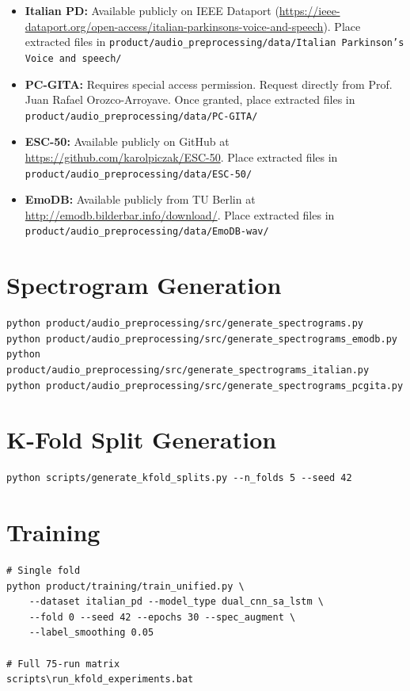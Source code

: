 \documentclass[oneside,openany]{final_report}
\begin{document}
\begin{itemize}
    \item \textbf{Italian PD:} Available publicly on IEEE Dataport (\url{https://ieee-dataport.org/open-access/italian-parkinsons-voice-and-speech}). Place extracted files in \texttt{product/audio\_preprocessing/data/Italian Parkinson's Voice and speech/}
    \item \textbf{PC-GITA:} Requires special access permission. Request directly from Prof. Juan Rafael Orozco-Arroyave. Once granted, place extracted files in \texttt{product/audio\_preprocessing/data/PC-GITA/}
    \item \textbf{ESC-50:} Available publicly on GitHub at \url{https://github.com/karolpiczak/ESC-50}. Place extracted files in \texttt{product/audio\_preprocessing/data/ESC-50/}
    \item \textbf{EmoDB:} Available publicly from TU Berlin at \url{http://emodb.bilderbar.info/download/}. Place extracted files in \texttt{product/audio\_preprocessing/data/EmoDB-wav/}
\end{itemize}

\section{Spectrogram Generation}
\begin{verbatim}
python product/audio_preprocessing/src/generate_spectrograms.py
python product/audio_preprocessing/src/generate_spectrograms_emodb.py
python product/audio_preprocessing/src/generate_spectrograms_italian.py
python product/audio_preprocessing/src/generate_spectrograms_pcgita.py
\end{verbatim}

\section{K-Fold Split Generation}
\begin{verbatim}
python scripts/generate_kfold_splits.py --n_folds 5 --seed 42
\end{verbatim}

\section{Training}
\begin{verbatim}
# Single fold
python product/training/train_unified.py \
    --dataset italian_pd --model_type dual_cnn_sa_lstm \
    --fold 0 --seed 42 --epochs 30 --spec_augment \
    --label_smoothing 0.05

# Full 75-run matrix
scripts\run_kfold_experiments.bat
\end{verbatim}
\end{document}

